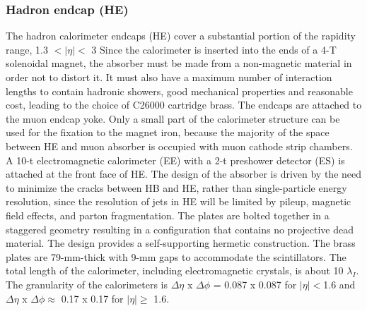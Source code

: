 \subsubsection{Hadron endcap (HE)}
The hadron calorimeter endcaps (HE) cover a substantial portion of the rapidity range, 1.3 $<|\eta|<$ 3 Since the calorimeter is inserted into the ends of a 4-T solenoidal magnet, the absorber must be made from a non-magnetic material in order not to distort it. It must also have a maximum number of interaction lengths to contain hadronic showers, good mechanical properties and reasonable cost, leading to the choice of C26000 cartridge brass. The endcaps are attached to the muon endcap yoke. Only a small part of the calorimeter structure can be used for the fixation to the magnet iron, because the majority of the space between HE and muon absorber is occupied with muon cathode strip chambers. A 10-t electromagnetic calorimeter (EE) with a 2-t preshower detector (ES) is attached at the front face of HE. The design of the absorber is driven by the need to minimize the cracks between HB and HE, rather than single-particle energy resolution, since the resolution of jets in HE will be limited by pileup, magnetic field effects, and parton fragmentation. The plates are bolted together in a staggered geometry resulting in a configuration that contains no projective dead material. The design provides a self-supporting hermetic construction. The brass plates are 79-mm-thick with 9-mm gaps to accommodate the scintillators. The total length of the calorimeter, including electromagnetic crystals, is about 10 $\lambda_{I}$. The granularity of the calorimeters is $\Delta \eta$ x $\Delta \phi$ = 0.087 x 0.087 for $|\eta|<$1.6 and $\Delta \eta$ x $\Delta \phi \approx$ 0.17 x 0.17 for $|\eta| \ge$ 1.6.

